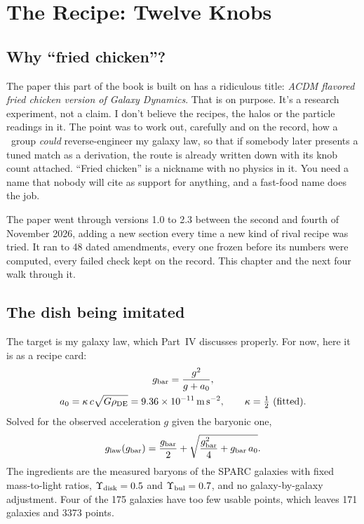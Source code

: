 \chapter{The Recipe: Twelve Knobs}




\section{Why ``fried chicken''?}

The paper this part of the book is built on has a ridiculous title: \emph{ACDM flavored fried chicken version of Galaxy Dynamics}. That is on purpose. It's a research experiment, not a claim. I don't believe the recipes, the halos or the particle readings in it. The point was to work out, carefully and on the record, how a \LCDM\ group \emph{could} reverse-engineer my galaxy law, so that if somebody later presents a tuned match as a derivation, the route is already written down with its knob count attached. ``Fried chicken'' is a nickname with no physics in it. You need a name that nobody will cite as support for anything, and a fast-food name does the job.

The paper went through versions 1.0 to 2.3 between the second and fourth of November 2026, adding a new section every time a new kind of rival recipe was tried. It ran to 48 dated amendments, every one frozen before its numbers were computed, every failed check kept on the record. This chapter and the next four walk through it.

\section{The dish being imitated}

The target is my galaxy law, which Part~IV discusses properly. For now, here it is as a recipe card:
\begin{gather}
\gbar=\frac{g^2}{g+a_0},\\
a_0=\kappa\,c\sqrt{G\rhoDE}=9.36\times10^{-11}\ms,\qquad\kappa=\tfrac12\ \text{(fitted)}.
\end{gather}
Solved for the observed acceleration $g$ given the baryonic one,
\begin{equation}
g_{\rm law}(g_{\rm bar})=\frac{g_{\rm bar}}{2}+\sqrt{\frac{g_{\rm bar}^2}{4}+g_{\rm bar}\,a_0}.
\end{equation}
The ingredients are the measured baryons of the SPARC galaxies with fixed mass-to-light ratios, $\Upsilon_{\rm disk}=0.5$ and $\Upsilon_{\rm bul}=0.7$, and no galaxy-by-galaxy adjustment. Four of the 175 galaxies have too few usable points, which leaves 171 galaxies and 3373 points.

